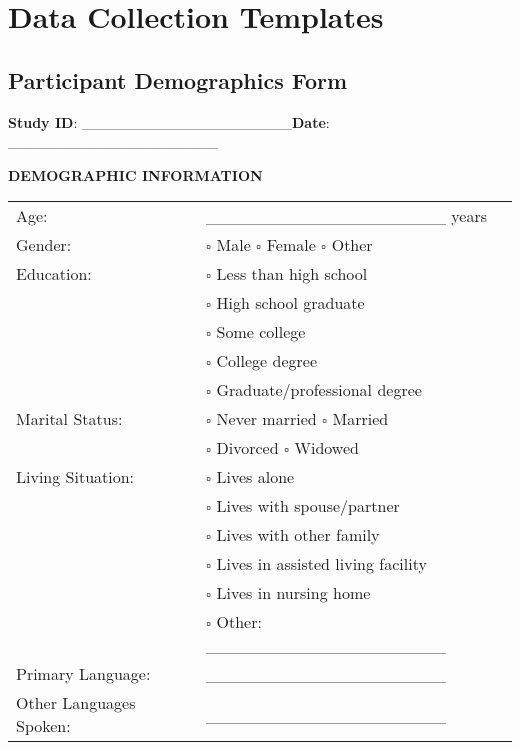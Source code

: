 \chapter{Data Collection Templates}

\section{Participant Demographics Form}

\begin{tcolorbox}[title=Participant Demographics Form]
\textbf{Study ID}: \_\_\_\_\_\_\_\_\_\_\_\_\_\_\_\_\_\_\_\_\hfill \textbf{Date}: \_\_\_\_\_\_\_\_\_\_\_\_\_\_\_\_\_\_\_\_

\vspace{0.5cm}

\textbf{DEMOGRAPHIC INFORMATION}

\begin{tabular}{p{7cm}p{7cm}}
Age: & \_\_\_\_\_\_\_\_\_\_\_\_\_\_\_\_\_\_\_\_ years \\[0.3cm]
Gender: & $\square$ Male \hspace{0.5cm} $\square$ Female \hspace{0.5cm} $\square$ Other \\[0.3cm]
Education: & $\square$ Less than high school \\
 & $\square$ High school graduate \\
 & $\square$ Some college \\
 & $\square$ College degree \\
 & $\square$ Graduate/professional degree \\[0.3cm]
Marital Status: & $\square$ Never married \hspace{0.5cm} $\square$ Married \\
 & $\square$ Divorced \hspace{0.5cm} $\square$ Widowed \\[0.3cm]
Living Situation: & $\square$ Lives alone \\
 & $\square$ Lives with spouse/partner \\
 & $\square$ Lives with other family \\
 & $\square$ Lives in assisted living facility \\
 & $\square$ Lives in nursing home \\
 & $\square$ Other: \_\_\_\_\_\_\_\_\_\_\_\_\_\_\_\_\_\_\_\_ \\[0.3cm]
Primary Language: & \_\_\_\_\_\_\_\_\_\_\_\_\_\_\_\_\_\_\_\_ \\[0.3cm]
Other Languages Spoken: & \_\_\_\_\_\_\_\_\_\_\_\_\_\_\_\_\_\_\_\_ \\
\end{tabular}


\end{tcolorbox}
